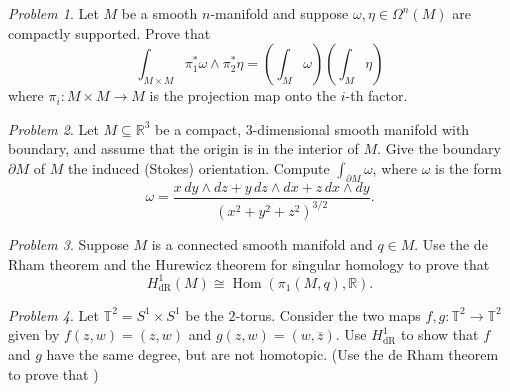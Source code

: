\documentclass[11pt,twoside]{amsart}
\theoremstyle{plain}
\theoremstyle{remark}
\newtheorem{prob}{Problem}
\theoremstyle{definition}
\theoremstyle{definition}
\newcommand{\RR}{\mathbb{R}}
\newcommand{\TT}{\mathbb{T}}
\newcommand{\dR}{\mathrm{dR}}
\newcommand{\Hom}{\operatorname{Hom}}
\begin{document}
\begin{prob}
Let $M$ be a smooth $n$-manifold and suppose $\omega,\eta\in \Omega^n(M)$ are compactly supported. Prove that
\[
  \int_{M\times M} \pi_1^*\omega\wedge \pi_2^*\eta = \left(\int_M\omega\right)\left(\int_M\eta\right)
\]
where $\pi_i\colon M\times M\to M$ is the projection map onto the $i$-th factor.
\end{prob}

\begin{prob}
Let $M\subseteq \RR^3$ be a compact, 3-dimensional smooth manifold with boundary, and assume that the origin is in the interior of $M$. Give the boundary $\partial M$ of $M$ the induced (Stokes) orientation. Compute $\int_{\partial M}\omega$, where $\omega$ is the form
\[
  \omega = \frac{x\,dy\wedge dz + y\, dz\wedge dx + z\, dx\wedge dy}{(x^2+y^2+z^2)^{3/2}}.
\]
\end{prob}

\begin{prob}
Suppose $M$ is a connected smooth manifold and $q\in M$.  Use the de Rham theorem and the Hurewicz theorem for singular homology to prove that
\[
  H^1_{\dR}(M)\cong \Hom(\pi_1(M,q),\RR).
\]
\end{prob}

\begin{prob}
Let $\TT^2 = S^1\times S^1$ be the $2$-torus. Consider the two maps $f,g\colon \TT^2\to\TT^2$ given by $f(z,w) = (z,w)$ and $g(z,w) = (w,\overline z)$. Use $H^1_{\dR}$ to show that $f$ and $g$ have the same degree, but are not homotopic. (Use the de Rham theorem to prove that )
\end{prob}
\end{document}
